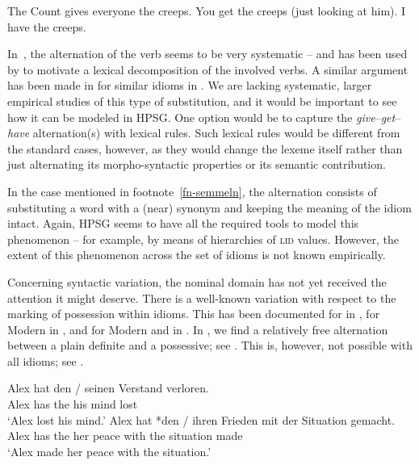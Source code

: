\documentclass[output=paper,biblatex,babelshorthands,newtxmath,draftmode,colorlinks,citecolor=brown]{langscibook}
\begin{document}
\eal  \label{creeps}
\ex The Count gives everyone the creeps.
\ex You get the creeps (just looking at him).
\ex I have the creeps.
\zl 

\noindent
In~, the alternation of the verb seems to be very systematic -- and has been used by
\citet{Richards:01} to motivate a lexical decomposition of the involved verbs.  A similar argument has been
made in \citet{Mateu:Espinal:07} for similar idioms in .  We are lacking systematic,
larger empirical studies of this type of substitution, and it would be important to see how it can
be modeled in HPSG.  One option would be to capture the \emph{give}--\emph{get}--\emph{have}
alternation(s) with lexical rules. Such lexical rules would be different from the standard cases,
however, as they would change the lexeme itself rather than just alternating its morpho-syntactic
properties or its semantic contribution.

In the case mentioned in footnote~\ref{fn-semmeln}, the alternation consists of substituting a word
with a (near) synonym and keeping the meaning of the idiom intact. Again, HPSG seems to have all the
required tools to model this phenomenon -- for example, by means of hierarchies of
\textsc{lid} values.  However, the extent of this phenomenon across the set of idioms is not
known empirically.

Concerning syntactic variation, the nominal domain has not yet received the attention it might
deserve.  There is a well-known variation with respect to the marking of possession within idioms.
This has been documented for  in \citet{Ho:15}, for Modern
 in \citet{Almog:12}, and for Modern  and 
in \citet{Markantonatou:Sailer:16}.  In , we find a relatively free alternation between
a plain definite and a possessive; see . This is, however, not possible with all
idioms; see .

\eal \label{ex-verstand-herz}
\ex 
\gll Alex hat den / seinen Verstand verloren.\\
Alex has the {} his mind lost\\
\glt `Alex lost his mind.'\label{ex-verstand}
\ex 
\gll Alex hat *den / ihren Frieden mit der Situation gemacht.\\
     Alex has \hphantom{*}the {} her peace with the situation made\\
\glt `Alex made her peace with the situation.'\label{ex-frieden}
\zl 
\end{document}
